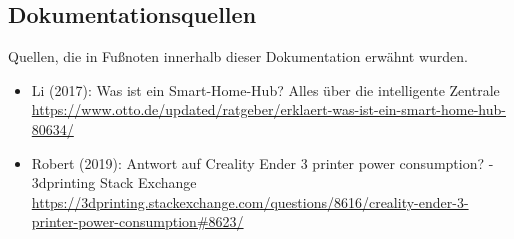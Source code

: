 \subsection{Dokumentationsquellen}
Quellen, die in Fußnoten innerhalb dieser Dokumentation erwähnt wurden.
\begin{itemize}
 		\item Li (2017): Was ist ein Smart-Home-Hub? Alles über die intelligente Zentrale\\ {\url{https://www.otto.de/updated/ratgeber/erklaert-was-ist-ein-smart-home-hub-80634/}}
 		\item Robert (2019): Antwort auf Creality Ender 3 printer power consumption? - 3dprinting Stack Exchange\\ {\url{https://3dprinting.stackexchange.com/questions/8616/creality-ender-3-printer-power-consumption#8623/}}
\end{itemize}